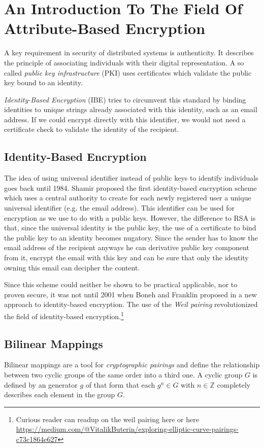 \section{An Introduction To The Field Of Attribute-Based Encryption}
A key requirement in security of distributed systems is authenticity. It describes the principle of associating individuals with their digital representation. A so called \textit{public key infrastructure} (\ac{PKI}) uses certificates which validate the public key bound to an identity.

\textit{Identity-Based Encryption} (\ac{IBE}) tries to circumvent this standard by binding identities to unique strings already associated with this identity, such as an email address. If we could encrypt directly with this identifier, we would not need a certificate check to validate the identity of the recipient. 

\subsection{Identity-Based Encryption}
The idea of using universal identifier instead of public keys to identify individuals goes back until 1984. Shamir proposed the first identity-based encryption scheme\cite{shamir1984identity} which uses a central authority to create for each newly registered user a unique universal identifier (e.g. the email address). This identifier can be used for encryption as we use to do with a public keys. However, the difference to \ac{RSA} is that, since the universal identity is the public key, the use of a certificate to bind the public key to an identity becomes nugatory. 
Since the sender has to know the email address of the recipient anyways he can derivative public key component from it, encrypt the email with this key and can be sure that only the identity owning this email can decipher the content. 

Since this scheme could neither be shown to be practical applicable, nor to proven secure, it was not until 2001 when Boneh and Franklin proposed in \cite{boneh2001identity} a new approach to identity-based encryption. The use of the \textit{Weil pairing} revolutionized the field of identity-based encryption.\footnote{Curious reader can readup on the weil pairing here \cite{Miller2004} \cite{galbraith2008pairings} or here \url{https://medium.com/@VitalikButerin/exploring-elliptic-curve-pairings-c73c1864e627}}

\subsection{Bilinear Mappings}
\label{sec:bilinearmappings}
Bilinear mappings are a tool for \textit{cryptographic pairings} and define the relationship between two cyclic groups of the same order into a third one. A cyclic group $G$ is defined by an generator $g$ of that form that each $g^n \in G$ with $n \in \mathbb{Z}$ completely describes each element in the group $G$.

